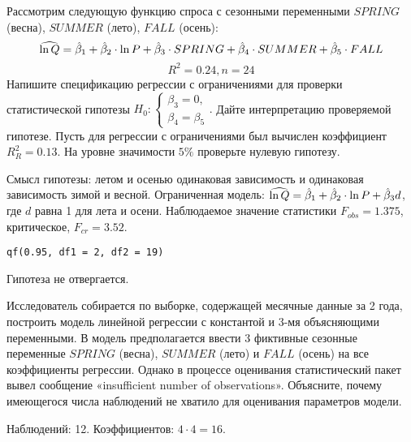 \begin{problem} %
 Рассмотрим следующую функцию спроса с сезонными переменными $SPRING$ (весна), $SUMMER$ (лето), $FALL$ (осень):
\[
\widehat{\ln Q}=\hat{\beta}_1+\hat{\beta}_2\cdot{\ln P}+\hat{\beta}_3\cdot{SPRING}+\hat{\beta}_4\cdot{SUMMER}+\hat{\beta}_5\cdot{FALL}
\]
\[
R^2=0.24,n=24
\]
Напишите спецификацию регрессии с ограничениями для проверки статистической гипотезы
$H_0:
  \begin{cases}
    \beta_3=0, \\
    \beta_4=\beta_5
 \end{cases}.$
Дайте интерпретацию проверяемой гипотезе. Пусть для регрессии с ограничениями был вычислен коэффициент $R_{R}^2=0.13$. На уровне значимости $5\%$ проверьте нулевую гипотезу.


\begin{sol}
Смысл гипотезы: летом и осенью одинаковая зависимость и одинаковая зависимость зимой и весной. Ограниченная модель: $\widehat{\ln Q}=\hat{\beta}_1+\hat{\beta}_2\cdot{\ln P}+\hat{\beta}_3 d$, где $d$ равна 1 для лета и осени. Наблюдаемое значение статистики $F_{obs}=1.375$, критическое, $F_{cr}=3.52$.
\begin{verbatim}
qf(0.95, df1 = 2, df2 = 19)
\end{verbatim}
Гипотеза не отвергается.
\end{sol}
\end{problem}



\begin{problem} %
Исследователь собирается по выборке, содержащей месячные данные за 2 года,
построить модель линейной регрессии с константой и 3-мя объясняющими переменными. В модель предполагается ввести 3 фиктивные сезонные переменные $SPRING$ (весна), $SUMMER$ (лето) и $FALL$ (осень) на все коэффициенты регрессии. Однако в процессе оценивания статистический пакет вывел сообщение «insufficient number of observations». Объясните, почему имеющегося числа наблюдений не хватило для оценивания параметров модели.


\begin{sol}
Наблюдений: 12. Коэффициентов: $4 \cdot 4 = 16$.
\end{sol}
\end{problem}



